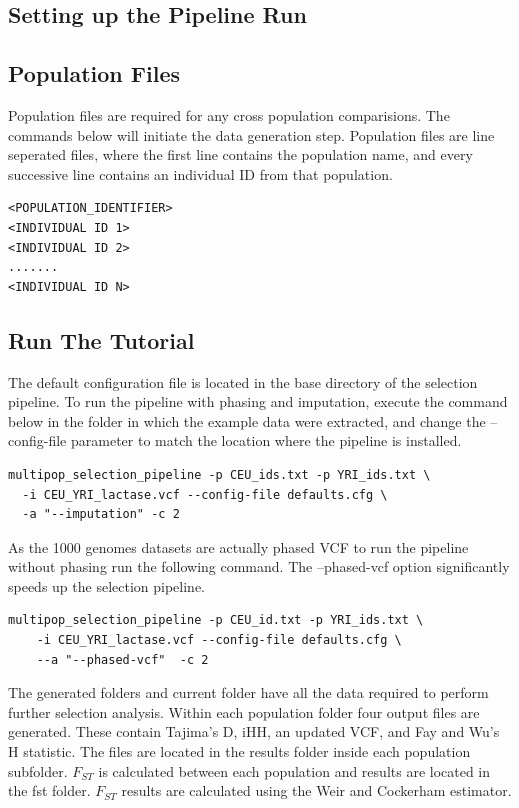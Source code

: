 \documentclass[a4paper,10pt]{article}
\begin{document}
\subsection{Setting up the Pipeline Run}
\subsection{Population Files}
Population files are required for any cross population
comparisions. The commands below will initiate the data generation
step. Population files are line seperated files, where the first line
contains the population name, and every successive line contains an
individual ID from that population.\\

\begin{verbatim}
<POPULATION_IDENTIFIER>
<INDIVIDUAL ID 1>
<INDIVIDUAL ID 2>
.......
<INDIVIDUAL ID N>
\end{verbatim}
\subsection{Run The Tutorial}
The default configuration file is located in the base directory of the
selection pipeline. To run the pipeline with phasing and imputation, execute the command below in the folder in which the example data were extracted, and change the
--config-file parameter to match the location where the pipeline is installed.\\
\begin{verbatim}
multipop_selection_pipeline -p CEU_ids.txt -p YRI_ids.txt \
  -i CEU_YRI_lactase.vcf --config-file defaults.cfg \
  -a "--imputation" -c 2
\end{verbatim}

\noindent
As the 1000 genomes datasets are actually phased VCF to run the pipeline without phasing run the following command. The --phased-vcf option significantly speeds up the selection pipeline.

\begin{verbatim}
multipop_selection_pipeline -p CEU_id.txt -p YRI_ids.txt \
    -i CEU_YRI_lactase.vcf --config-file defaults.cfg \
    --a "--phased-vcf"  -c 2  
\end{verbatim} 

\noindent
The generated folders and current folder have all the data required to
perform further selection analysis. Within each population folder four
output files are generated.  These contain Tajima's D, iHH, an updated
VCF, and Fay and Wu's H statistic. The files are located in the
results folder inside each population subfolder. $F_{ST}$ is calculated
between each population and results are located in the fst folder. $F_{ST}$
results are calculated using the Weir and Cockerham estimator.
\end{document}
